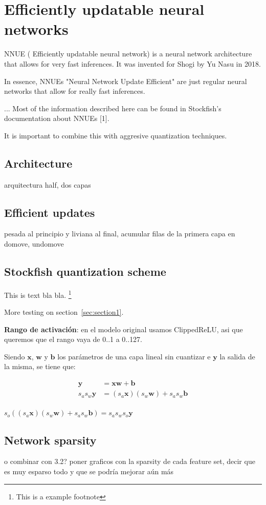 \section{Efficiently updatable neural networks}

NNUE ( Efficiently updatable neural network) is a neural network architecture that allows for very fast inferences. It was invented for Shogi by Yu Nasu in 2018.

In essence, NNUEs "Neural Network Update Efficient" are just regular neural networks that allow for really fast inferences.

...
Most of the information described here can be found in Stockfish's documentation about NNUEs [1].


It is important to combine this with aggresive quantization techniques.

\subsection{Architecture}


arquitectura half, dos capas


\subsection{Efficient updates}

pesada al principio y liviana al final, acumular filas de la primera capa en domove, undomove

\subsection{Stockfish quantization scheme}


This is text bla bla. \footnote[2]{This is a example footnote}

More testing on section~\ref{sec:section1}.



\textbf{Rango de activación}: en el modelo original usamos ClippedReLU, asi que queremos que el rango vaya de 0..1 a 0..127.


Siendo $\bm{x}$, $\bm{w}$ y $\bm{b}$ los parámetros de una capa lineal sin cuantizar e $\bm{y}$ la salida de la misma, se tiene que:

\begin{equation}
\begin{aligned}
\bm{y} &= \bm{x} \bm{w} + \bm{b} \\
s_a s_w \bm{y} &= (s_a \bm{x}) (s_w \bm{w}) + s_a s_w \bm{b} \\
\end{aligned}
\end{equation}



\vspace{1cm}
$s_o ((s_a \bm{x}) (s_w \bm{w}) + s_a s_w \bm{b}) = s_a s_w s_o \bm{y}$



\subsection{Network sparsity}

o combinar con 3.2?
poner graficos con la sparsity de cada feature set, decir que es muy esparso todo y que se podría mejorar aún más
